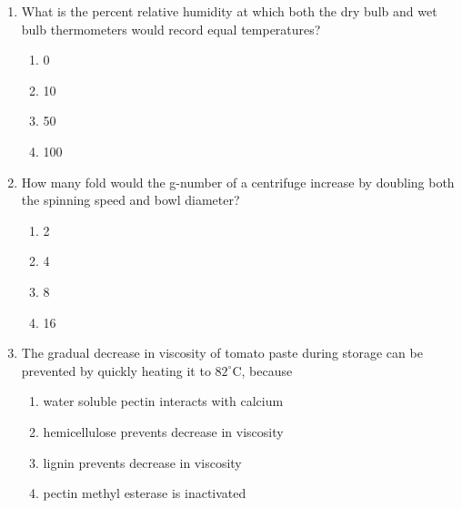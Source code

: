 \documentclass[journal,12pt,onecolumn]{IEEEtran}
\begin{document}
\begin{enumerate}[label=\arabic*)]
\vspace{0.5cm}

\item What is the percent relative humidity at which both the dry bulb and wet bulb thermometers would record equal temperatures?
\hfill{} \\

\vspace{0.2cm}
\begin{enumerate}[label=\alph*)]
\item 0
\item 10
\item 50
\item 100
\end{enumerate}

\vspace{0.5cm}

\item How many fold would the g-number of a centrifuge increase by doubling both the spinning speed and bowl diameter?
\hfill{} \\

\vspace{0.2cm}
\begin{enumerate}[label=\alph*)]
\item 2
\item 4
\item 8
\item 16
\end{enumerate}

\vspace{0.5cm}

\item The gradual decrease in viscosity of tomato paste during storage can be prevented by quickly heating it to $82^\circ$C, because
\hfill{} \\

\vspace{0.2cm}
\begin{enumerate}[label=\alph*)]
\item water soluble pectin interacts with calcium
\item hemicellulose prevents decrease in viscosity
\item lignin prevents decrease in viscosity
\item pectin methyl esterase is inactivated
\end{enumerate}

\vspace{0.5cm}


\end{enumerate}
\end{document}
